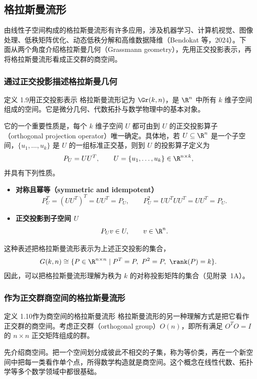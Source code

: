 \subsection{格拉斯曼流形}
由线性子空间构成的格拉斯曼流形有许多应用，涉及机器学习、计算机视觉、图像处理、低秩矩阵优化、动态低秩分解和高维数据降维（Bendokat 等，2024）。下面从两个角度介绍格拉斯曼几何（Grassmann geometry），先用正交投影表示，再将格拉斯曼流形看成正交群的商空间。

\subsubsection{通过正交投影描述格拉斯曼几何}
\begin{statement}{定义 1.9}{用正交投影表示}
格拉斯曼流形记为 $\Gr(k,n)$，是 $\R^n$ 中所有 $k$ 维子空间组成的空间。它是微分几何、代数拓扑与数学物理中的基本对象。

它的一个重要性质是，每个 $k$ 维子空间 $U$ 都可由到 $U$ 的正交投影算子（orthogonal projection operator）唯一确定。具体地，若 $U\subseteq\R^n$ 是一个子空间，$\{u_1,\ldots,u_k\}$ 是 $U$ 的一组标准正交基，则到 $U$ 的投影算子定义为
\[
  P_U=UU^T,\qquad
  U=\{u_1,\ldots,u_k\}\in\R^{n\times k},
\]
并具有下列性质。
\begin{itemize}
  \item \textbf{对称且幂等（symmetric and idempotent）}
  \[
    P_U^T=(UU^T)^T=UU^T=P_U,\qquad
    P_U^2=UU^TUU^T=UU^T=P_U.
  \]
  \item \textbf{正交投影到子空间 $U$}
  \[
    P_Uv\in U,\qquad v\in\R^n.
  \]
\end{itemize}
\end{statement}

这种表述把格拉斯曼流形表示为上述正交投影的集合，
\[
  G(k,n)\cong\{P\in\R^{n\times n}\mid
    P^T=P,\ P^2=P,\ \rank(P)=k\}.
\]
因此，可以把格拉斯曼流形理解为秩为 $k$ 的对称投影矩阵的集合（见附录~1A）。

\subsubsection{作为正交群商空间的格拉斯曼流形}
\begin{statement}{定义 1.10}{作为商空间的格拉斯曼流形}
格拉斯曼流形的另一种理解方式是把它看作正交群的商空间。考虑正交群（orthogonal group）$O(n)$，即所有满足 $O^TO=I$ 的 $n\times n$ 正交矩阵组成的群。

先介绍商空间。把一个空间划分成彼此不相交的子集，称为等价类，再在一个新空间中把每一类看作单个点，所得数学构造就是商空间。这个概念在线性代数、拓扑学等多个数学领域中都很基础。
\end{statement}

